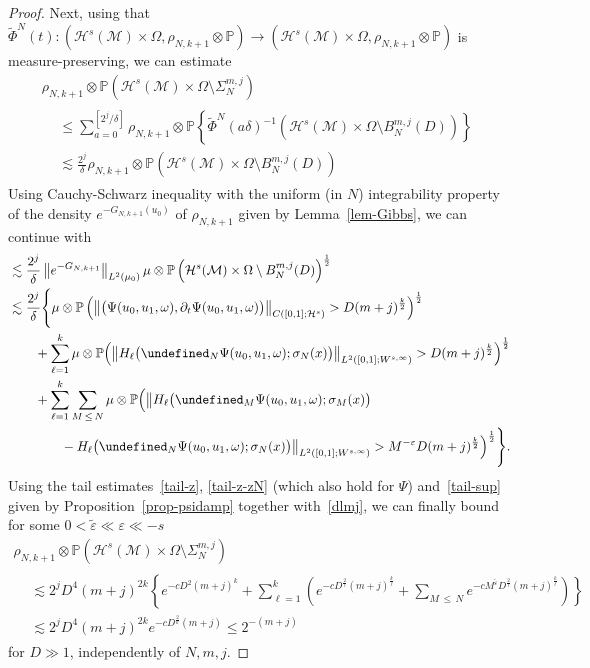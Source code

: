 \documentclass[AHL,Unicode,longabstracts,published]{cedram}
\newcommand{\Prob}{\mathbb{P}}
\let\P= \undefined
\newcommand{\P}{\mathbf{P}}
\newcommand{\M}{\mathcal{M}}
\renewcommand{\H}{\mathcal{H}}
\newcommand{\dl}{\delta}
\newcommand{\eps}{\varepsilon}
\newcommand{\s}{\sigma}
\newcommand{\Si}{\Sigma}
\newcommand{\wt}{\widetilde}
\newcommand{\dt}{\partial_t}
\renewcommand{\o}{\omega}
\renewcommand{\O}{\Omega}
\newcommand{\les}{\lesssim}
\begin{document}
\begin{proof}
Next, using that $\wt\Phi^N(t): (\H^s(\M)\times \O,\rho_{N,k+1}\otimes\Prob) \to (\H^s(\M)\times \O,\rho_{N,k+1}\otimes\Prob)$ is measure-preserving, we can estimate
\begin{multline*}
\rho_{N,k+1}\otimes\Prob\left(\H^s(\M)\times\O\setminus\Si_{N}^{m,j}\right)\\
\begin{aligned}
&\leq \sum_{a=0}^{\left[2^j/\dl\right]}\rho_{N,k+1}\otimes\Prob\left\{\wt\Phi^N(a\dl)^{-1}\left(\H^s(\M)\times\O\setminus B_N^{m,j}(D)\right)\right\}\\
&\les \frac{2^j}{\dl}\rho_{N,k+1}\otimes\Prob\left(\H^s(\M)\times\O\setminus B_N^{m,j}(D)\right)
\end{aligned}
\end{multline*}
Using Cauchy-Schwarz inequality with the uniform (in $N$) integrability property of the density $e^{-G_{N,k+1}(u_0)}$ of $\rho_{N,k+1}$ given by Lemma~\ref{lem-Gibbs}, we can continue with
\begin{align*}
&\les\frac{2^j}{\dl}\left\|e^{-G_{N,k+1}}\right\|_{L^2(\mu_0)}\mu\otimes\Prob\left(\H^s(\M)\times\O\setminus B_N^{m,j}(D)\right)^{\frac12}\\
&\les\frac{2^j}{\dl}\Bigg\{\mu\otimes\Prob\left(\left\|\big(\Psi(u_0,u_1,\o),\dt\Psi(u_0,u_1,\o)\big)\right\|_{C\left([0,1];\H^s\right)} > D(m+j)^{\frac{k}2}\right)^{\frac12}\\
&\qquad + \sum_{\ell=1}^k\mu\otimes\Prob\Big(\big\|H_{\ell}\big(\P_N\Psi(u_0,u_1,\o);\s_N(x)\big)\big\|_{L^2([0,1];W^{s,\infty})}> D(m+j)^{\frac{k}2}\Big)^{\frac12}\\
&\qquad+\sum_{\ell=1}^k\sum_{M\,\le\,N}\mu\otimes\Prob\Big(\big\|H_{\ell}\big(\P_M\Psi(u_0,u_1,\o);\s_M(x)\big)\\
&\qquad\qquad-H_{\ell}\big(\P_N\Psi(u_0,u_1,\o);\s_N(x)\big)\big\|_{L^2([0,1];W^{s,\infty})}\notag > M^{-\eps}D(m+j)^{\frac{k}2}\Big)^{\frac12}\Bigg\}.
\end{align*}
Using the tail estimates~\eqref{tail-z}, \eqref{tail-z-zN} (which also hold for $\Psi$) and~\eqref{tail-sup} given by Proposition~\ref{prop-psidamp} together with~\eqref{dlmj}, we can finally bound for some $0<\wt\eps\ll\eps\ll -s$
\begin{multline}\label{Si1}
\rho_{N,k+1}\otimes\Prob\left(\H^s(\M)\times\O\setminus\Si_{N}^{m,j}\right)\\
\begin{aligned}
&\les 2^jD^{4}(m+j)^{2k}\left\{ e^{-cD^2(m+j)^k}
+\sum_{\ell=1}^k\left(e^{-cD^{\frac2\ell}(m+j)^{\frac{k}\ell}}+\sum_{M\,\le\,N}e^{-cM^{\wt\eps}D^{\frac2\ell}(m+j)^{\frac{k}\ell}}\right)\right\}\\
&\les 2^jD^{4}(m+j)^{2k}e^{-cD^{\frac2k}(m+j)}\le 2^{-(m+j)}
\end{aligned}
\end{multline}
for $D\gg 1$, independently of $N,m,j$.


\end{proof}
\end{document}
